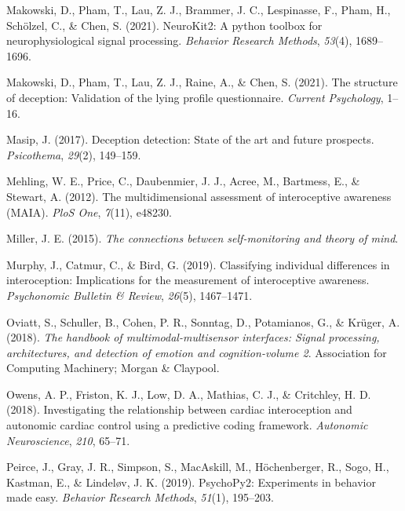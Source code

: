 \documentclass[
  man,mask,floatsintext]{apa6}
\newlength{\cslhangindent}
\newlength{\cslentryspacingunit} %
\newenvironment{CSLReferences}[2] %
 {%
  \setlength{\parindent}{0pt}
  \ifodd #1
  \let\oldpar\par
  \def\par{\hangindent=\cslhangindent\oldpar}
  \fi
  \setlength{\parskip}{#2\cslentryspacingunit}
 }%
 {}
\begin{document}
\begin{CSLReferences}{1}{0}
\leavevmode{}%
Makowski, D., Pham, T., Lau, Z. J., Brammer, J. C., Lespinasse, F., Pham, H., Schölzel, C., \& Chen, S. (2021). NeuroKit2: A python toolbox for neurophysiological signal processing. \emph{Behavior Research Methods}, \emph{53}(4), 1689--1696.

\leavevmode{}%
Makowski, D., Pham, T., Lau, Z. J., Raine, A., \& Chen, S. (2021). The structure of deception: Validation of the lying profile questionnaire. \emph{Current Psychology}, 1--16.

\leavevmode{}%
Masip, J. (2017). Deception detection: State of the art and future prospects. \emph{Psicothema}, \emph{29}(2), 149--159.

\leavevmode{}%
Mehling, W. E., Price, C., Daubenmier, J. J., Acree, M., Bartmess, E., \& Stewart, A. (2012). The multidimensional assessment of interoceptive awareness (MAIA). \emph{PloS One}, \emph{7}(11), e48230.

\leavevmode{}%
Miller, J. E. (2015). \emph{The connections between self-monitoring and theory of mind}.

\leavevmode{}%
Murphy, J., Catmur, C., \& Bird, G. (2019). Classifying individual differences in interoception: Implications for the measurement of interoceptive awareness. \emph{Psychonomic Bulletin \& Review}, \emph{26}(5), 1467--1471.

\leavevmode{}%
Oviatt, S., Schuller, B., Cohen, P. R., Sonntag, D., Potamianos, G., \& Krüger, A. (2018). \emph{The handbook of multimodal-multisensor interfaces: Signal processing, architectures, and detection of emotion and cognition-volume 2}. Association for Computing Machinery; Morgan \& Claypool.

\leavevmode{}%
Owens, A. P., Friston, K. J., Low, D. A., Mathias, C. J., \& Critchley, H. D. (2018). Investigating the relationship between cardiac interoception and autonomic cardiac control using a predictive coding framework. \emph{Autonomic Neuroscience}, \emph{210}, 65--71.

\leavevmode{}%
Peirce, J., Gray, J. R., Simpson, S., MacAskill, M., Höchenberger, R., Sogo, H., Kastman, E., \& Lindeløv, J. K. (2019). PsychoPy2: Experiments in behavior made easy. \emph{Behavior Research Methods}, \emph{51}(1), 195--203.


\end{CSLReferences}
\end{document}
